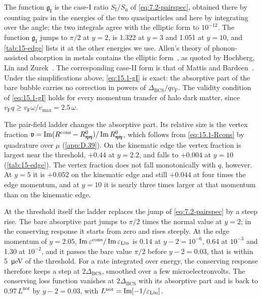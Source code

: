 \noindent The function $\mathfrak{g}_{\mathrm{I}}$ is the case-I ratio $S_{\mathrm{I}}/S_{\mathrm{n}}$ of \cref{eq:7.2-pairspec}, obtained there by counting pairs in the energies of the two quasiparticles and here by integrating over the angle; the two integrals agree with the elliptic form to $10^{-12}$. The function $\mathfrak{g}_{\mathrm{I}}$ jumps to $\pi/2$ at $y = 2$, is 1.322 at $y = 3$ and 1.051 at $y = 10$, and \cref{tab:15-edge} lists it at the other energies we use. Allen's theory of phonon-assisted absorption in metals contains the elliptic form~\cite{allen1971electron}, as quoted by Hochberg, Lin and Zurek~\cite[Eq.~(17)]{hochberg2016absorption}. The corresponding case-II form is that of Mattis and Bardeen~\cite{mattis1958theory}. Under the simplifications above, \cref{eq:15.1-gI} is exact: the absorptive part of the bare bubble carries no correction in powers of $\Delta_{\mathrm{BCS}}/qv_{\mathrm{F}}$. The validity condition of \cref{eq:15.1-gI} holds for every momentum transfer of halo dark matter, since $v_{\mathrm{F}}q \ge v_{\mathrm{F}}\omega/v_{\mathrm{max}} = 2.5\,\omega$.

The pair-field ladder changes the absorptive part. Its relative size is the vertex fraction $\mathfrak{v} = \operatorname{Im}(R^{\mathrm{cons}} - R^0_{\boldsymbol{\eta}\boldsymbol{\eta}})/\operatorname{Im} R^0_{\boldsymbol{\eta}\boldsymbol{\eta}}$, which follows from \cref{eq:15.1-Rcons} by quadrature over $\mu$ (\cref{app:D.39}). On the kinematic edge the vertex fraction is largest near the threshold, $+0.44$ at $y = 2.2$, and falls to $+0.004$ at $y = 10$ (\cref{tab:15-edge}). The vertex fraction does not fall monotonically with $q$, however. At $y = 5$ it is $+0.052$ on the kinematic edge and still $+0.044$ at four times the edge momentum, and at $y = 10$ it is nearly three times larger at that momentum than on the kinematic edge.

At the threshold itself the ladder replaces the jump of \cref{eq:7.2-pairspec} by a steep rise. The bare absorptive part jumps to $\pi/2$ times the normal value at $y = 2$; in the conserving response it starts from zero and rises steeply. At the edge momentum of $y = 2.05$, $\operatorname{Im}\varepsilon^{\mathrm{cons}}/\operatorname{Im}\varepsilon_{\mathrm{Lin}}$ is 0.14 at $y - 2 = 10^{-6}$, 0.64 at $10^{-3}$ and 1.30 at $10^{-2}$, and it passes the bare value $\pi/2$ before $y - 2 = 0.03$, that is within \SI{5}{\micro eV} of the threshold. For a rate integrated over energy, the conserving response therefore keeps a step at $2\Delta_{\mathrm{BCS}}$, smoothed over a few microelectronvolts. The conserving loss function vanishes at $2\Delta_{\mathrm{BCS}}$ with its absorptive part and is back to $0.97\,L^{\mathrm{nor}}$ by $y - 2 = 0.03$, with $L^{\mathrm{nor}} = \operatorname{Im}[-1/\varepsilon_{\mathrm{Lin}}]$.

